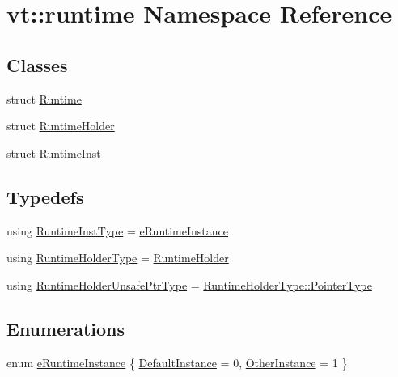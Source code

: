 \hypertarget{namespacevt_1_1runtime}{}\section{vt\+:\+:runtime Namespace Reference}
\label{namespacevt_1_1runtime}
\subsection*{Classes}
\begin{DoxyCompactItemize}
\item 
struct \hyperlink{structvt_1_1runtime_1_1_runtime}{Runtime}
\item 
struct \hyperlink{structvt_1_1runtime_1_1_runtime_holder}{Runtime\+Holder}
\item 
struct \hyperlink{structvt_1_1runtime_1_1_runtime_inst}{Runtime\+Inst}
\end{DoxyCompactItemize}
\subsection*{Typedefs}
\begin{DoxyCompactItemize}
\item 
using \hyperlink{namespacevt_1_1runtime_a012376d47cd009c2e6305f17de9fcfe9}{Runtime\+Inst\+Type} = \hyperlink{namespacevt_1_1runtime_afca910c1b38b3975f7c1da8001a77d58}{e\+Runtime\+Instance}
\item 
using \hyperlink{namespacevt_1_1runtime_ab09d044cce417fbcdb7e1e29b7aabbc3}{Runtime\+Holder\+Type} = \hyperlink{structvt_1_1runtime_1_1_runtime_holder}{Runtime\+Holder}
\item 
using \hyperlink{namespacevt_1_1runtime_a69931905b04961a874e4a70a43083a83}{Runtime\+Holder\+Unsafe\+Ptr\+Type} = \hyperlink{structvt_1_1runtime_1_1_runtime_holder_a9740e8aa7487fcf38b67a7e160d7b046}{Runtime\+Holder\+Type\+::\+Pointer\+Type}
\end{DoxyCompactItemize}
\subsection*{Enumerations}
\begin{DoxyCompactItemize}
\item 
enum \hyperlink{namespacevt_1_1runtime_afca910c1b38b3975f7c1da8001a77d58}{e\+Runtime\+Instance} \{ \hyperlink{namespacevt_1_1runtime_afca910c1b38b3975f7c1da8001a77d58af4b803eff3cdc140ed473828f9c89101}{Default\+Instance} = 0, 
\hyperlink{namespacevt_1_1runtime_afca910c1b38b3975f7c1da8001a77d58af541bede5bc84a16357c26d30a508ff4}{Other\+Instance} = 1
 \}
\end{DoxyCompactItemize}
